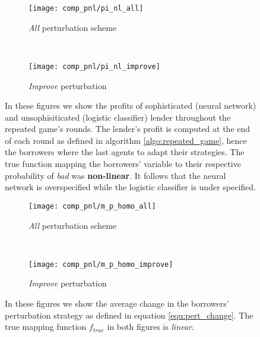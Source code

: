 \documentclass[12pt]{article} %
\begin{document}
\begin{figure*}[ht!]
    \centering
    \begin{subfigure}{0.5\textwidth}
        \centering
        \texttt{[image: comp\_pnl/pi\_nl\_all]}
        \caption{\textit{All} perturbation scheme}
        \label{fig:nl_cross_algo_all}
    \end{subfigure}%
    ~ 
    \begin{subfigure}{0.5\textwidth}
        \centering
        \texttt{[image: comp\_pnl/pi\_nl\_improve]}
            \caption{\textit{Improve} perturbation}
        \label{fig:nl_cross_algo_improve}
    \end{subfigure}
    \caption{
In these figures we show the profits of sophisticated (neural network) and unsophisiticated (logistic classifier) lender throughout the repeated game's rounds. The lender's profit is computed at the end of each round as defined in algorithm \ref{algo:repeated_game}, hence the borrowers where the last agents to adapt their strategies. The true function mapping the borrowers' variable to their respective probability of \textit{bad} was \textbf{non-linear}. It follows that the neural network is overspecified while the logistic classifier is under specified.}
\end{figure*}





\begin{figure*}[ht!]
    \centering
    \begin{subfigure}{0.5\textwidth}
        \centering
        \texttt{[image: comp\_pnl/m\_p\_homo\_all]}
        \caption{\textit{All} perturbation scheme}
        \label{fig:mp_cross_algo_all}
    \end{subfigure}%
    ~ 
    \begin{subfigure}{0.5\textwidth}
        \centering
        \texttt{[image: comp\_pnl/m\_p\_homo\_improve]}
            \caption{\textit{Improve} perturbation}
        \label{fig:mp_cross_algo_improve}
    \end{subfigure}
    \caption{
In these figures we show the average change in the borrowers' perturbation strategy as defined in equation \ref{equ:pert_change}. The true mapping function $f_{true}$ in both figures is \textit{linear}. 
}
\end{figure*}
\end{document}
